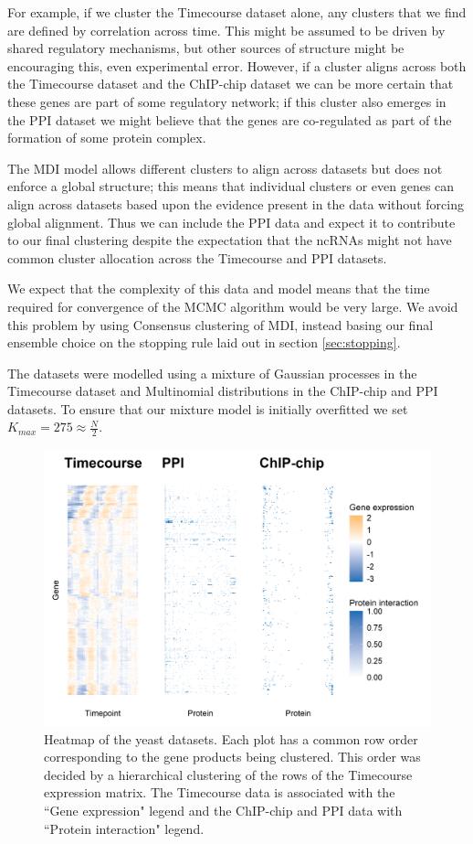 \documentclass[]{article}
\begin{document}
For example, if we cluster the Timecourse dataset alone, any clusters that we find are defined by correlation across time. This might be assumed to be driven by shared regulatory mechanisms, but other sources of structure might be encouraging this, even experimental error. However, if a cluster aligns across both the Timecourse dataset and the ChIP-chip dataset we can be more certain that these genes are part of some regulatory network; if this cluster also emerges in the PPI dataset we might believe that the genes are co-regulated as part of the formation of some protein complex.

The MDI model allows different clusters to align across datasets but does not enforce a global structure; this means that individual clusters or even genes can align across datasets based upon the evidence present in the data without forcing global alignment. Thus we can include the PPI data and expect it to contribute to our final clustering despite the expectation that the ncRNAs might not have common cluster allocation across the Timecourse and PPI datasets.

We expect that the complexity of this data and model means that the time required for convergence of the MCMC algorithm would be very large. We avoid this problem by using Consensus clustering of MDI, instead basing our final ensemble choice on the stopping rule laid out in section \ref{sec:stopping}.

The datasets were modelled using a mixture of Gaussian processes in the Timecourse dataset and Multinomial distributions in the ChIP-chip and PPI datasets. To ensure that our mixture model is initially overfitted we set $K_{max}=275\approx\frac{N}{2}$.

\begin{figure}
	\centering
	\includegraphics[scale=0.7]{./Images/Yeast/yeastData.png}
	\caption{Heatmap of the yeast datasets. Each plot has a common row order corresponding to the gene products being clustered. This order was decided by a hierarchical clustering of the rows of the Timecourse expression matrix. The Timecourse data is associated with the ``Gene expression" legend and the ChIP-chip and PPI data with ``Protein interaction" legend.}
	\label{fig:yeastData}
\end{figure}
\end{document}
